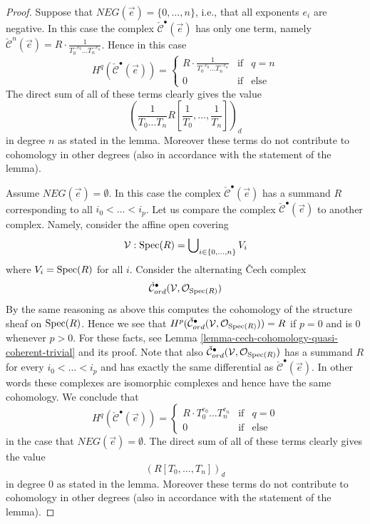 \begin{proof}
\medskip\noindent
Suppose that $NEG(\vec{e}) = \{0, \ldots, n\}$, i.e., that all
exponents $e_i$ are negative.
In this case the complex $\check{\mathcal{C}}^\bullet(\vec{e})$ has
only one term, namely $\check{\mathcal{C}}^n(\vec{e}) =
R \cdot \frac{1}{T_0^{-e_0} \ldots T_n^{-e_n}}$. Hence in this
case
$$
H^q(\check{\mathcal{C}}^\bullet(\vec{e})) =
\left\{
\begin{matrix}
R \cdot \frac{1}{T_0^{-e_0} \ldots T_n^{-e_n}} & \text{if} & q = n \\
0 & \text{if} & \text{else}
\end{matrix}
\right.
$$
The direct sum of all of these terms clearly gives the value
$$
\left(\frac{1}{T_0 \ldots T_n} R[\frac{1}{T_0}, \ldots, \frac{1}{T_n}]\right)_d
$$
in degree $n$ as stated in the lemma. Moreover these terms do not contribute
to cohomology in other degrees (also in accordance with the statement of the
lemma).

\medskip\noindent
Assume $NEG(\vec{e}) = \emptyset$. In this case the complex
$\check{\mathcal{C}}^\bullet(\vec{e})$ has a summand $R$ corresponding
to all $i_0 < \ldots < i_p$.
Let us compare the complex $\check{\mathcal{C}}^\bullet(\vec{e})$
to another complex. Namely, consider the affine open covering
$$
\mathcal{V} : \mathop{\mathrm{Spec}}(R) = \bigcup\nolimits_{i \in \{0, \ldots, n\}} V_i
$$
where $V_i = \mathop{\mathrm{Spec}}(R)$ for all $i$. Consider the alternating
{\v C}ech complex
$$
\check{\mathcal{C}}_{ord}^\bullet(\mathcal{V}, \mathcal{O}_{\mathop{\mathrm{Spec}}(R)})
$$
By the same reasoning as above this computes the cohomology of the
structure sheaf on $\mathop{\mathrm{Spec}}(R)$. Hence we see that
$H^p(
\check{\mathcal{C}}_{ord}^\bullet(\mathcal{V}, \mathcal{O}_{\mathop{\mathrm{Spec}}(R)})
) = R$ if $p = 0$ and is $0$ whenever $p > 0$.
For these facts, see
Lemma \ref{lemma-cech-cohomology-quasi-coherent-trivial} and its proof.
Note that also
$\check{\mathcal{C}}_{ord}^\bullet(\mathcal{V}, \mathcal{O}_{\mathop{\mathrm{Spec}}(R)})$
has a summand $R$ for every $i_0 < \ldots < i_p$ and has exactly the same
differential as $\check{\mathcal{C}}^\bullet(\vec{e})$. In other words
these complexes are isomorphic complexes and hence have the same cohomology.
We conclude that
$$
H^q(\check{\mathcal{C}}^\bullet(\vec{e})) =
\left\{
\begin{matrix}
R \cdot T_0^{e_0} \ldots T_n^{e_n} & \text{if} & q = 0 \\
0 & \text{if} & \text{else}
\end{matrix}
\right.
$$
in the case that $NEG(\vec{e}) = \emptyset$.
The direct sum of all of these terms clearly gives the value
$$
(R[T_0, \ldots, T_n])_d
$$
in degree $0$ as stated in the lemma. Moreover these terms do not contribute
to cohomology in other degrees (also in accordance with the statement of the
lemma).


\end{proof}
